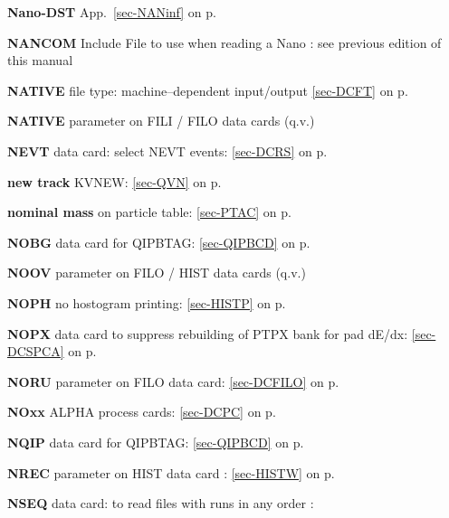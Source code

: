  \item{\bf Nano-DST   }App.~\ref{sec-NANinf} on p.~\pageref{sec-NANinf}\\
 \item{\bf NANCOM     }Include File to use when reading a Nano :
      see previous edition of this manual           \\
 \item{\bf NATIVE  }file type: machine--dependent input/output
 \ref{sec-DCFT} on p.~\pageref{sec-DCFT}\\
 \item{\bf NATIVE  }parameter on FILI / FILO data cards (q.v.)\\
 \item{\bf NEVT    }data card: select NEVT events: \ref{sec-DCRS} on p.~\pageref{sec-DCRS}\\
 \item{\bf new track   }KVNEW: \ref{sec-QVN} on p.~\pageref{sec-QVN}\\
 \item{\bf nominal mass    }on particle table: \ref{sec-PTAC} on p.~\pageref{sec-PTAC}\\
 \item{\bf NOBG    }data card for QIPBTAG: \ref{sec-QIPBCD} on p.~\pageref{sec-QIPBCD}\\
 \item{\bf NOOV    }parameter on FILO / HIST data cards (q.v.)\\
 \item{\bf NOPH    }no hostogram printing: \ref{sec-HISTP} on p.~\pageref{sec-HISTP}\\
 \item{\bf NOPX    }data card to suppress rebuilding of PTPX bank for pad dE/dx: \ref{sec-DCSPCA} on p.~\pageref{sec-DCSPCA}\\
 \item{\bf NORU    }parameter on FILO data card: \ref{sec-DCFILO} on p.~\pageref{sec-DCFILO}\\
 \item{\bf NOxx    }ALPHA process cards: \ref{sec-DCPC} on p.~\pageref{sec-DCPC}\\
 \item{\bf NQIP    }data card for QIPBTAG: \ref{sec-QIPBCD} on p.~\pageref{sec-QIPBCD}\\
 \item{\bf NREC    }parameter on HIST data card : \ref{sec-HISTW} on p.~\pageref{sec-HISTW}\\
 \item{\bf NSEQ    }data card: to read files with runs in any order :
